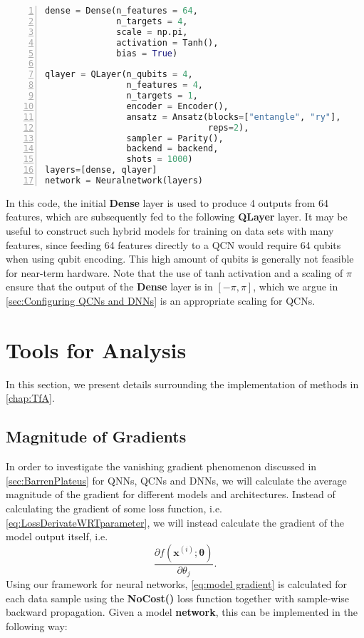 \begin{lstlisting}[language=python, numbers=left]
dense = Dense(n_features = 64,
              n_targets = 4,
              scale = np.pi,
              activation = Tanh(),
              bias = True)
              
qlayer = QLayer(n_qubits = 4,
                n_features = 4,
                n_targets = 1,
                encoder = Encoder(),
                ansatz = Ansatz(blocks=["entangle", "ry"],
                                reps=2),
                sampler = Parity(),
                backend = backend,
                shots = 1000)
layers=[dense, qlayer]       
network = Neuralnetwork(layers)
\end{lstlisting}
In this code, the initial \textbf{Dense} layer is used to produce 4 outputs from 64 features, which are subsequently fed to the following \textbf{QLayer} layer. It may be useful to construct such hybrid models for training on data sets with many features, since feeding 64 features directly to a QCN would require 64 qubits when using qubit encoding. This high amount of qubits is generally not feasible for near-term hardware. Note that the use of tanh activation and a scaling of $\pi$ ensure that the output of the \textbf{Dense} layer is in $[-\pi, \pi]$, which we argue in \autoref{sec:Configuring QCNs and DNNs} is an appropriate scaling for QCNs.


\section{Tools for Analysis}\label{sec:Tools for Analysis Imp}
In this section, we present details surrounding the implementation of methods in \autoref{chap:TfA}. 


\subsection{Magnitude of Gradients}\label{sec:Magnitude of Gradients}
In order to investigate the vanishing gradient phenomenon discussed in \autoref{sec:BarrenPlateus} for QNNs, QCNs and DNNs, we will calculate the average magnitude of the gradient for different models and architectures. Instead of calculating the gradient of some loss function, i.e. \autoref{eq:LossDerivateWRTparameter}, we will instead calculate the gradient of the model output itself, i.e.
\begin{equation}\label{eq:model gradient}
    \frac{\partial f(\boldsymbol{x}^{(i)};\boldsymbol{\theta})}{\partial \theta_j}.
\end{equation}
Using our framework for neural networks, \autoref{eq:model gradient} is calculated for each data sample using the \textbf{NoCost()} loss function together with sample-wise backward propagation. Given a model \textbf{network}, this can be implemented in the following way:

